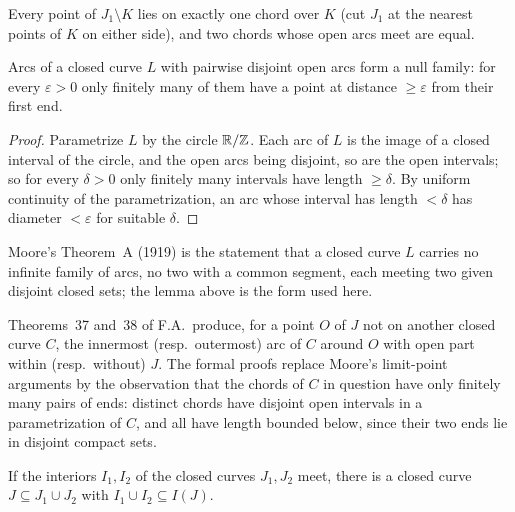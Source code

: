 Every point of $J_1\setminus K$ lies on exactly one chord over $K$ (cut $J_1$ at the nearest points of $K$ on either side), and two
chords whose open arcs meet are equal.

\begin{lemma}\label{lem:chords-null}
Arcs of a closed curve $L$ with pairwise disjoint open arcs form a null family: for every $\varepsilon>0$ only finitely many of
them have a point at distance $\ge\varepsilon$ from their first end.
\end{lemma}

\begin{proof}
Parametrize $L$ by the circle $\mathbb{R}/\mathbb{Z}$. Each arc of $L$ is the image of a closed interval of the circle, and the open arcs being
disjoint, so are the open intervals; so for every $\delta>0$ only finitely many intervals have length $\ge\delta$. By uniform
continuity of the parametrization, an arc whose interval has length $<\delta$ has diameter $<\varepsilon$ for suitable $\delta$.
\end{proof}


Moore's Theorem~A (1919) is the statement that a closed curve $L$ carries no infinite family of arcs, no two with a common
segment, each meeting two given disjoint closed sets; the lemma above is the form used here.

Theorems~37 and~38 of F.A.\ produce, for a point $O$ of $J$ not on another closed curve $C$, the innermost (resp.\ outermost) arc of
$C$ around $O$ with open part within (resp.\ without) $J$. The formal proofs replace Moore's limit-point arguments by the
observation that the chords of $C$ in question have only finitely many pairs of ends: distinct chords have disjoint open
intervals in a parametrization of $C$, and all have length bounded below, since their two ends lie in disjoint compact sets.


\begin{theorem}[F.A.\ Theorem~41]\label{thm:fa41}
If the interiors $I_1,I_2$ of the closed curves $J_1,J_2$ meet, there is a closed curve $J\subseteq J_1\cup J_2$ with $I_1\cup
I_2\subseteq I(J)$.
\end{theorem}

